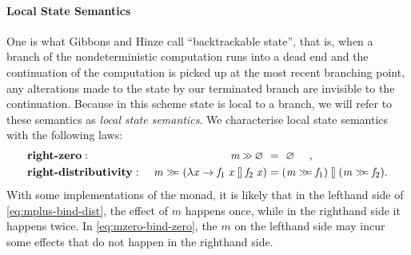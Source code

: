 \documentclass{jfp}
\newcommand{\Varid}[1]{\mathit{#1}}
\let\Varid\mathit
\begin{document}
\paragraph{Local State Semantics}
One is what Gibbons and Hinze call ``backtrackable state'', that is, when a
branch of the nondeterministic computation runs into a dead end and the
continuation of the computation is picked up at the most recent branching point,
any alterations made to the state by our terminated branch are invisible to the
continuation.
Because in this scheme state is local to a branch, we will refer to these
semantics as \emph{local state semantics}.
We characterise local state semantics with the following laws:
\begin{alignat}{2}
&\mbox{\bf right-zero}:~&
  \ensuremath{\Varid{m}\mathbin{\hstretch{0.7}{>\!\!>}}\Varid{\varnothing}}~ &=~ \ensuremath{\Varid{\varnothing}} ~~\mbox{~~,}
    \label{eq:mzero-bind-zero}\\
&\mbox{\bf right-distributivity}:~&
  \ensuremath{\Varid{m}\mathrel{\hstretch{0.7}{>\!\!>\!\!=}}(\lambda \Varid{x}\to \Varid{f}_{1}\;\Varid{x}\mathbin{\talloblong}\Varid{f}_{2}\;\Varid{x})} &= \ensuremath{(\Varid{m}\mathrel{\hstretch{0.7}{>\!\!>\!\!=}}\Varid{f}_{1})\mathbin{\talloblong}(\Varid{m}\mathrel{\hstretch{0.7}{>\!\!>\!\!=}}\Varid{f}_{2})} \mbox{.}
    \label{eq:mplus-bind-dist}
\end{alignat}
With some implementations of the monad, it is likely that in the lefthand side of \eqref{eq:mplus-bind-dist}, the effect of \ensuremath{\Varid{m}} happens once, while in the righthand side it happens twice. In \eqref{eq:mzero-bind-zero}, the \ensuremath{\Varid{m}} on the lefthand side may incur some effects that do not happen in the righthand side.
\end{document}
